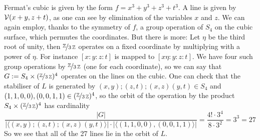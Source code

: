 \begin{example}
Fermat's cubic is given by the form $f = x^3 + y^3 + z^3 + t^3$.
A line is given by $\operatorname{\mathcal V}(x + y, z + t)$, as one can see by elimination of the variables $x$ and $z$.
We can again employ, thanks to the symmetry of $f$, a group operation of $S_4$ on the cubic surface, which permutes the coordinates.
But there is more: Let $\eta$ be the third root of unity, then $\nicefrac{\operatorname{\mathbb Z}}{3\operatorname{\mathbb Z}}$ operates on a fixed coordinate by multiplying with a power of $\eta$.
For instance $[x:y:z:t]$ is mapped to $[x\eta:y:z:t]$.
We have four such group operations by $\nicefrac{\operatorname{\mathbb Z}}{3\operatorname{\mathbb Z}}$ (one for each coordinate), so we can say that $G := S_4\times (\nicefrac{\operatorname{\mathbb Z}}{3\operatorname{\mathbb Z}})^4$ operates on the lines on the cubic.
One can check that the stabiliser of $L$ is generated by $(x,y);(z,t);(x,z)(y,t) \in S_4$ and $(1,1,0,0),(0,0,1,1) \in (\nicefrac{\operatorname{\mathbb Z}}{3\operatorname{\mathbb Z}})^4$, so the orbit of the operation by the product $S_4\times (\nicefrac{\operatorname{\mathbb Z}}{3\operatorname{\mathbb Z}})^4$ has cardinality
\begin{equation}
\frac{|G|}{|\langle (x,y);(z,t);(x,z)(y,t) \rangle|\cdot|\langle (1,1,0,0), (0,0,1,1)\rangle|} = \frac{4!\cdot 3^4}{8\cdot 3^2} = 3^3 = 27
\end{equation}
So we see that all of the 27 lines lie in the orbit of $L$.
\end{example}

